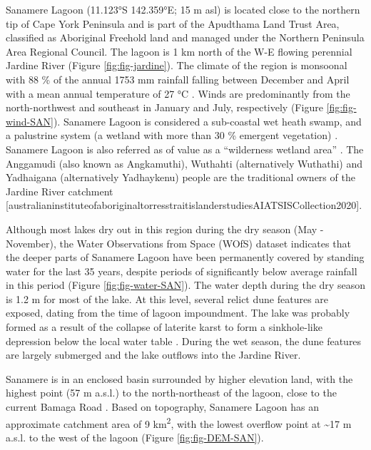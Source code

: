 \documentclass[
  12pt,
]{book}
\begin{document}
Sanamere Lagoon (11.123°S 142.359°E; 15 m asl) is located close to the northern tip of Cape York Peninsula and is part of the Apudthama Land Trust Area, classified as Aboriginal Freehold land and managed under the Northern Peninsula Area Regional Council. The lagoon is 1 km north of the W-E flowing perennial Jardine River (Figure \ref{fig:fig-jardine}). The climate of the region is monsoonal with 88 \% of the annual 1753 mm rainfall falling between December and April with a mean annual temperature of 27 °C \citep{bomMonthlyClimateStatistics2018}. Winds are predominantly from the north-northwest and southeast in January and July, respectively \citep{bomRoseWindDirection2019} (Figure \ref{fig:fig-wind-SAN}). Sanamere Lagoon is considered a sub-coastal wet heath swamp, and a palustrine system (a wetland with more than 30 \% emergent vegetation) \citep{departmentofenvironmentscienceWetlandInfoWetlandSystems2018}. Sanamere Lagoon is also referred as of value as a ``wilderness wetland area'' \citep{abrahamsAreasConservationSignificance1995}. The Anggamudi (also known as Angkamuthi), Wuthahti (alternatively Wuthathi) and Yadhaigana (alternatively Yadhaykenu) people are the traditional owners of the Jardine River catchment {[}australianinstituteofaboriginaltorresstraitislanderstudiesAIATSISCollection2020{]}.

Although most lakes dry out in this region during the dry season (May - November), the Water Observations from Space (WOfS) dataset \citep{muellerWaterObservationsSpace2016, commonwealthofaustraliaUnfilteredSummaryAll2018} indicates that the deeper parts of Sanamere Lagoon have been permanently covered by standing water for the last 35 years, despite periods of significantly below average rainfall in this period (Figure \ref{fig:fig-water-SAN}). The water depth during the dry season is 1.2 m for most of the lake. At this level, several relict dune features are exposed, dating from the time of lagoon impoundment. The lake was probably formed as a result of the collapse of laterite karst to form a sinkhole-like depression below the local water table \citep{grimes2008laterite}. During the wet season, the dune features are largely submerged and the lake outflows into the Jardine River.

Sanamere is in an enclosed basin surrounded by higher elevation land, with the highest point (57 m a.s.l.) to the north-northeast of the lagoon, close to the current Bamaga Road \citep{geoscience-australiaSRTMSecImage2015}. Based on topography, Sanamere Lagoon has an approximate catchment area of 9 km\textsuperscript{2}, with the lowest overflow point at \textasciitilde17 m a.s.l. to the west of the lagoon (Figure \ref{fig:fig-DEM-SAN}).
\end{document}
